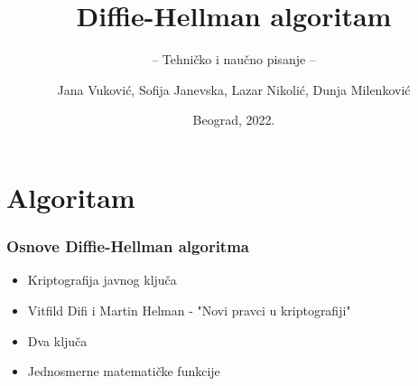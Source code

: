 \documentclass[14pt]{beamer}
\title{Diffie-Hellman algoritam}
\subtitle{-- Tehničko i naučno pisanje --}
\author{Jana Vuković, Sofija Janevska, Lazar Nikolić, Dunja Milenković}
\institute{Matematički fakultet\\Univerzitet u Beogradu}
\date{
	\footnotesize{Beograd, 2022.}	
}
\begin{document}
\begin{frame}
	\thispagestyle{empty}
	\titlepage
\end{frame}

\addtocounter{framenumber}{-1}

\section{Algoritam}

\begin{frame}[fragile]\frametitle{Osnove Diffie-Hellman algoritma}
	\begin{itemize}
		\item Kriptografija javnog ključa
		\item Vitfild Difi i Martin Helman - "Novi pravci u kriptografiji"
		\item Dva ključa
		\item Jednosmerne matematičke funkcije
	\end{itemize}
\end{frame}

\end{document}
